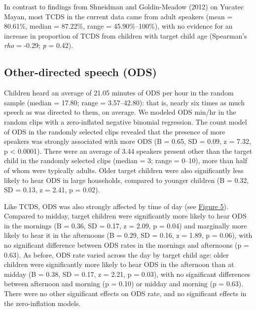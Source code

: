 \documentclass[floatsintext,man]{apa6}
\theoremstyle{definition}
\theoremstyle{definition}
\theoremstyle{definition}
\theoremstyle{remark}
\begin{document}
In contrast to findings from Shneidman and Goldin-Meadow (2012) on
Yucatec Mayan, most TCDS in the current data came from adult speakers
(mean = 80.61\%, median = 87.22\%, range = 45.90\%--100\%), with no
evidence for an increase in proportion of TCDS from children with target
child age (Spearman's \emph{rho} = -0.29; \emph{p} = 0.42).

\subsection{Other-directed speech
(ODS)}\label{other-directed-speech-ods}

Children heard an average of 21.05 minutes of ODS per hour in the random
sample (median = 17.80; range = 3.57--42.80): that is, nearly six times
as much speech as was directed to them, on average. We modeled ODS
min/hr in the random clips with a zero-inflated negative binomial
regression. The count model of ODS in the randomly selected clips
revealed that the presence of more speakers was strongly associated with
more ODS (B = 0.65, SD = 0.09, z = 7.32, p \textless{} 0.0001). There
were an average of 3.44 speakers present other than the target child in
the randomly selected clips (median = 3; range = 0--10), more than half
of whom were typically adults. Older target children were also
significantly less likely to hear ODS in large households, compared to
younger children (B = 0.32, SD = 0.13, z = 2.41, p = 0.02).

Like TCDS, ODS was also strongly affected by time of day (see
\protect\hyperlink{fig5}{Figure 5}). Compared to midday, target children
were significantly more likely to hear ODS in the mornings (B = 0.36, SD
= 0.17, z = 2.09, p = 0.04) and marginally more likely to hear it in the
afternoons (B = 0.29, SD = 0.16, z = 1.89, p = 0.06), with no
significant difference between ODS rates in the mornings and afternoons
(p = 0.63). As before, ODS rate varied across the day by target child
age: older children were significantly more likely to hear ODS in the
afternoon than at midday (B = 0.38, SD = 0.17, z = 2.21, p = 0.03), with
no significant differences between afternoon and morning (p = 0.10) or
midday and morning (p = 0.63). There were no other significant effects
on ODS rate, and no significant effects in the zero-inflation models.
\end{document}
